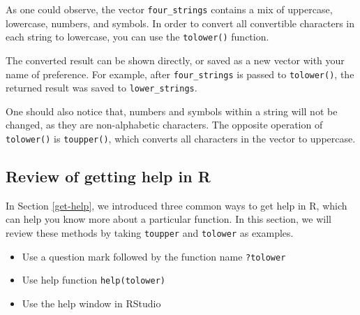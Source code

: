 \documentclass[
]{book}
\newenvironment{Shaded}{\begin{snugshade}}{\end{snugshade}}
\newcommand{\CommentTok}[1]{\textcolor[rgb]{0.56,0.35,0.01}{\textit{#1}}}
\newcommand{\FunctionTok}[1]{\textcolor[rgb]{0.00,0.00,0.00}{#1}}
\newcommand{\NormalTok}[1]{#1}
\newcommand{\OtherTok}[1]{\textcolor[rgb]{0.56,0.35,0.01}{#1}}
\providecommand{\tightlist}{%
  \setlength{\itemsep}{0pt}\setlength{\parskip}{0pt}}
\begin{document}
As one could observe, the vector \texttt{four\_strings} contains a mix of uppercase, lowercase, numbers, and symbols. In order to convert all convertible characters in each string to lowercase, you can use the \texttt{tolower()} function.

The converted result can be shown directly, or saved as a new vector with your name of preference. For example, after \texttt{four\_strings} is passed to \texttt{tolower()}, the returned result was saved to \texttt{lower\_strings}.

\begin{Shaded}
\end{Shaded}

One should also notice that, numbers and symbols within a string will not be changed, as they are non-alphabetic characters.
The opposite operation of \texttt{tolower()} is \texttt{toupper()}, which converts all characters in the vector to uppercase.

\begin{Shaded}
\end{Shaded}

\hypertarget{review-of-getting-help-in-r}{%
\subsection{Review of getting help in R}\label{review-of-getting-help-in-r}}

In Section \ref{get-help}, we introduced three common ways to get help in R, which can help you know more about a particular function. In this section, we will review these methods by taking \texttt{toupper} and \texttt{tolower} as examples.

\begin{itemize}
\tightlist
\item
  Use a question mark followed by the function name \texttt{?tolower}
\item
  Use help function \texttt{help(tolower)}
\item
  Use the help window in RStudio
\end{itemize}
\end{document}
